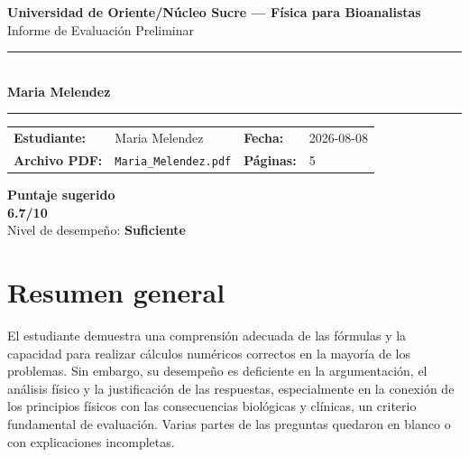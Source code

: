 \documentclass[11pt,a4paper]{article}
\begin{document}
\begin{center}
  {\Large\bfseries\color{azulTitulo} Universidad de Oriente/Núcleo Sucre --- Física para Bioanalistas}\\[4pt]
  {\large Informe de Evaluación Preliminar}\\[12pt]
  \rule{\linewidth}{1.2pt}\\[6pt]
  {\LARGE\bfseries Maria Melendez}\\[4pt]
  \rule{\linewidth}{0.6pt}
\end{center}

\vspace{4pt}
\begin{tcolorbox}[cajaTitulo, title=Datos del informe]
\begin{tabular}{@{}llll@{}}
  \textbf{Estudiante:}  & Maria Melendez  &
  \textbf{Fecha:}       & 2026-08-08 \\[4pt]
  \textbf{Archivo PDF:} & \texttt{Maria\_Melendez.pdf}  &
  \textbf{Páginas:}     & 5 \\
\end{tabular}
\end{tcolorbox}

\vspace{6pt}
\begin{center}
  \begin{tcolorbox}[
    enhanced,
    colback=white, colframe=desempeno_suficiente,
    width=0.62\linewidth,
    boxrule=2pt,
    halign=center, valign=center,
    top=8pt, bottom=8pt,
  ]
    \centering
    {\large\bfseries Puntaje sugerido}\\[6pt]
    {\Huge\bfseries\color{desempeno_suficiente} 6.7/10}\\[6pt]
    {\large Nivel de desempeño: \textbf{\color{desempeno_suficiente} Suficiente}}
  \end{tcolorbox}
\end{center}

\section*{Resumen general}
El estudiante demuestra una comprensión adecuada de las fórmulas y la capacidad para realizar cálculos numéricos correctos en la mayoría de los problemas. Sin embargo, su desempeño es deficiente en la argumentación, el análisis físico y la justificación de las respuestas, especialmente en la conexión de los principios físicos con las consecuencias biológicas y clínicas, un criterio fundamental de evaluación. Varias partes de las preguntas quedaron en blanco o con explicaciones incompletas.
\end{document}
